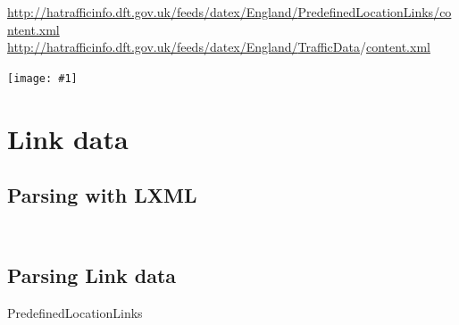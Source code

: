 \documentclass[aspectratio=169]{beamer}
\newcommand{\alerturl}[1]{\alert{\url{#1}}}
\newcommand{\tallimage}[1]{%
  \begin{frame}
    \centering
    \texttt{[image: \#1]}
    \\
  \end{frame}
}
\begin{document}
\begin{frame}
  \Large\centering
  \url{http://hatrafficinfo.dft.gov.uk/feeds/datex/England/}\alerturl{PredefinedLocationLinks}\url{/content.xml}
  \\
  \vspace{1\baselineskip}
  \url{http://hatrafficinfo.dft.gov.uk/feeds/datex/England/}\alerturl{TrafficData}/\url{content.xml}
  \\
\end{frame}

\tallimage{img/datex2.png}

\section{Link data}

\subsection{Parsing with LXML}
\begin{frame}
  \inputminted{xml}{document.xml}
  \vspace{\baselineskip}
  \inputminted{python}{lxml_objectify.py}
\end{frame}

\subsection{Parsing Link data}
\begin{frame}
  \centering\Huge
  PredefinedLocationLinks
  \\
\end{frame}

\begin{frame}
  \inputminted{xml}{PredefinedLocationLinks/structure.xml}
\end{frame}

\begin{frame}
  \inputminted{xml}{PredefinedLocationLinks/location.xml}
\end{frame}

\begin{frame}
  \inputminted{python}{PredefinedLocationLinks/structure.py}
\end{frame}

\begin{frame}
  \inputminted{python}{PredefinedLocationLinks/structure_out.py}
\end{frame}

\begin{frame}
  \inputminted{python}{wgs84-links.py}
\end{frame}
\end{document}
